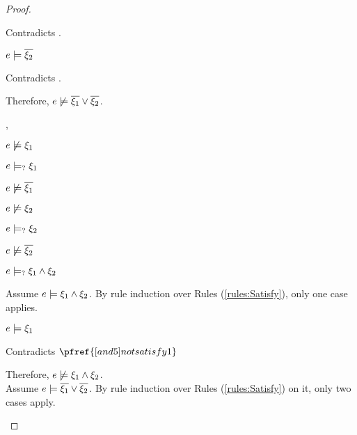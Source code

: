 \begin{proof}
\begin{byCases}
\begin{byCases}
\begin{byCases}
            Contradicts .
        \item[\text{(\ref{rule:CSOr2})}]
            \begin{pfsteps*}
            \item $e \models \overline{\xi_2}$ 
            \end{pfsteps*}
            Contradicts .
        \end{byCases}
        Therefore, $e \not\models \overline{\xi_1} \vee \overline{\xi_2}$.
    \item[\cmaysatisfy{e}{\xi_1},\cmaysatisfy{e}{\xi_2}]
        \begin{pfsteps*}
        \item $e \not\models \xi_1$  
        \item $e \models_{?} \xi_1$  
        \item $e \not\models \overline{\xi_1}$  
        \item $e \not\models \xi_2$  
        \item $e \models_{?} \xi_2$  
        \item $e \not\models \overline{\xi_2}$  
        \item $e \models_{?} \xi_1 \wedge \xi_2$  
        \end{pfsteps*}
        Assume $e \models \xi_1 \wedge \xi_2$. By rule induction over Rules (\ref{rules:Satisfy}), only one case applies.
        \begin{byCases}
        \item[\text{(\ref{rule:CSAnd})}]
            \begin{pfsteps*}
            \item $e \models \xi_1$ 
            \end{pfsteps*}
            Contradicts $\pfref{[and5]notsatisfy1}$
        \end{byCases}
        Therefore, $e \not\models \xi_1 \wedge \xi_2$.\\
        Assume $e \models \overline{\xi_1} \vee \overline{\xi_2}$. By rule induction over Rules (\ref{rules:Satisfy}) on it, only two cases apply.

\end{byCases}
\end{byCases}
\end{proof}
